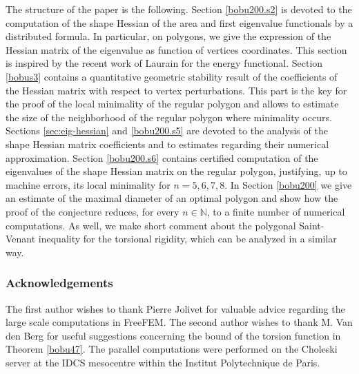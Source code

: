 \documentclass[JEP,XML,SOM,Unicode,ThmDefs,NoFloatCountersInSection,published]{cedram}
\theoremstyle{plain}
\theoremstyle{definition}
\def\N{\mathbb{N}}
\begin{document}
\smallskip
The structure of the paper is the following. Section \ref{bobu200.s2}
is devoted to the computation of the shape Hessian of the area and first eigenvalue functionals by a distributed formula. In particular, on polygons, we give the expression of the Hessian matrix of the eigenvalue as function of vertices coordinates. This section is inspired by the recent work of Laurain \cite{laurain2ndDeriv} for the energy functional. Section \ref{bobus3} contains a quantitative geometric stability result of the coefficients of the Hessian matrix with respect to vertex perturbations. This part is the key for the proof of the local minimality of the regular polygon and allows to estimate the size of the neighborhood of the regular polygon where minimality occurs. Sections \ref{sec:eig-hessian} and \ref{bobu200.s5} are devoted to the analysis of the shape Hessian matrix coefficients and to estimates regarding their numerical approximation. Section \ref{bobu200.s6} contains certified computation of the eigenvalues of the shape Hessian matrix on the regular polygon, justifying, up to machine errors, its local minimality for $n= 5, 6, 7, 8$. In Section \ref{bobu200} we give an estimate of the maximal diameter of an optimal polygon and show how the proof of the conjecture reduces, for every $n \in \N$, to a finite number of numerical computations. As well, we make short comment about the polygonal Saint-Venant inequality for the torsional rigidity, which can be analyzed in a similar way.

\subsubsection*{Acknowledgements}
The first author wishes to thank Pierre Jolivet for valuable advice regarding the large scale computations in FreeFEM. The second author wishes to thank M. Van den Berg for useful suggestions concerning the bound of the torsion function in Theorem \ref{bobu47}. The parallel computations were performed on the Choleski server at the IDCS mesocentre within the Institut Polytechnique de Paris.
\end{document}
